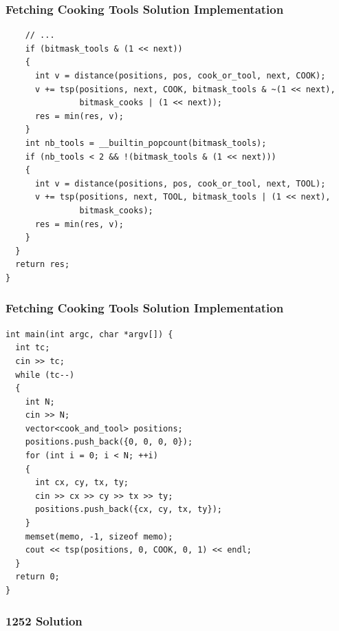 \documentclass{beamer}
\newcommand{\uvalink}[2]{UVa Online Judge (http://uva.onlinejudge.org)
  problem number \href{#2}{\textcolor{blue}{#1}.}}
\newcounter{exo}
\newcommand{\exo}{
  \addtocounter{exo}{1}
  Exercice \arabic{exo}
}
\begin{document}
\begin{frame}[containsverbatim]
\frametitle{Fetching Cooking Tools Solution Implementation}

\scriptsize
\begin{lstlisting}
    // ...
    if (bitmask_tools & (1 << next))
    {
      int v = distance(positions, pos, cook_or_tool, next, COOK);
      v += tsp(positions, next, COOK, bitmask_tools & ~(1 << next),
               bitmask_cooks | (1 << next));
      res = min(res, v);
    }
    int nb_tools = __builtin_popcount(bitmask_tools);
    if (nb_tools < 2 && !(bitmask_tools & (1 << next)))
    {
      int v = distance(positions, pos, cook_or_tool, next, TOOL);
      v += tsp(positions, next, TOOL, bitmask_tools | (1 << next),
               bitmask_cooks);
      res = min(res, v);
    }
  }
  return res;
}
\end{lstlisting}

\end{frame}

\begin{frame}[containsverbatim]
\frametitle{Fetching Cooking Tools Solution Implementation}

\scriptsize
\begin{lstlisting}
int main(int argc, char *argv[]) {
  int tc;
  cin >> tc;
  while (tc--)
  {
    int N;
    cin >> N;
    vector<cook_and_tool> positions;
    positions.push_back({0, 0, 0, 0});
    for (int i = 0; i < N; ++i)
    {
      int cx, cy, tx, ty;
      cin >> cx >> cy >> tx >> ty;
      positions.push_back({cx, cy, tx, ty});
    }
    memset(memo, -1, sizeof memo);
    cout << tsp(positions, 0, COOK, 0, 1) << endl;
  }
  return 0;
}
\end{lstlisting}

\end{frame}

\fi


\ifanswers

\begin{frame}%
\frametitle{1252 Solution}

\end{frame}
\end{document}
